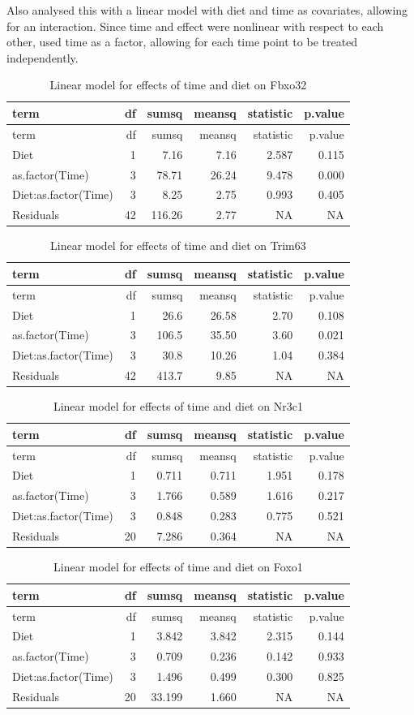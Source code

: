 \documentclass[]{article}
\begin{document}
Also analysed this with a linear model with diet and time as covariates,
allowing for an interaction. Since time and effect were nonlinear with
respect to each other, used time as a factor, allowing for each time
point to be treated independently.

\begin{longtable}[]{@{}lrrrrr@{}}
\caption{Linear model for effects of time and diet on
Fbxo32}\tabularnewline
\toprule
term & df & sumsq & meansq & statistic & p.value\tabularnewline
\midrule
\endfirsthead
\toprule
term & df & sumsq & meansq & statistic & p.value\tabularnewline
\midrule
\endhead
Diet & 1 & 7.16 & 7.16 & 2.587 & 0.115\tabularnewline
as.factor(Time) & 3 & 78.71 & 26.24 & 9.478 & 0.000\tabularnewline
Diet:as.factor(Time) & 3 & 8.25 & 2.75 & 0.993 & 0.405\tabularnewline
Residuals & 42 & 116.26 & 2.77 & NA & NA\tabularnewline
\bottomrule
\end{longtable}

\begin{longtable}[]{@{}lrrrrr@{}}
\caption{Linear model for effects of time and diet on
Trim63}\tabularnewline
\toprule
term & df & sumsq & meansq & statistic & p.value\tabularnewline
\midrule
\endfirsthead
\toprule
term & df & sumsq & meansq & statistic & p.value\tabularnewline
\midrule
\endhead
Diet & 1 & 26.6 & 26.58 & 2.70 & 0.108\tabularnewline
as.factor(Time) & 3 & 106.5 & 35.50 & 3.60 & 0.021\tabularnewline
Diet:as.factor(Time) & 3 & 30.8 & 10.26 & 1.04 & 0.384\tabularnewline
Residuals & 42 & 413.7 & 9.85 & NA & NA\tabularnewline
\bottomrule
\end{longtable}

\begin{longtable}[]{@{}lrrrrr@{}}
\caption{Linear model for effects of time and diet on
Nr3c1}\tabularnewline
\toprule
term & df & sumsq & meansq & statistic & p.value\tabularnewline
\midrule
\endfirsthead
\toprule
term & df & sumsq & meansq & statistic & p.value\tabularnewline
\midrule
\endhead
Diet & 1 & 0.711 & 0.711 & 1.951 & 0.178\tabularnewline
as.factor(Time) & 3 & 1.766 & 0.589 & 1.616 & 0.217\tabularnewline
Diet:as.factor(Time) & 3 & 0.848 & 0.283 & 0.775 & 0.521\tabularnewline
Residuals & 20 & 7.286 & 0.364 & NA & NA\tabularnewline
\bottomrule
\end{longtable}

\begin{longtable}[]{@{}lrrrrr@{}}
\caption{Linear model for effects of time and diet on
Foxo1}\tabularnewline
\toprule
term & df & sumsq & meansq & statistic & p.value\tabularnewline
\midrule
\endfirsthead
\toprule
term & df & sumsq & meansq & statistic & p.value\tabularnewline
\midrule
\endhead
Diet & 1 & 3.842 & 3.842 & 2.315 & 0.144\tabularnewline
as.factor(Time) & 3 & 0.709 & 0.236 & 0.142 & 0.933\tabularnewline
Diet:as.factor(Time) & 3 & 1.496 & 0.499 & 0.300 & 0.825\tabularnewline
Residuals & 20 & 33.199 & 1.660 & NA & NA\tabularnewline
\bottomrule
\end{longtable}
\end{document}
